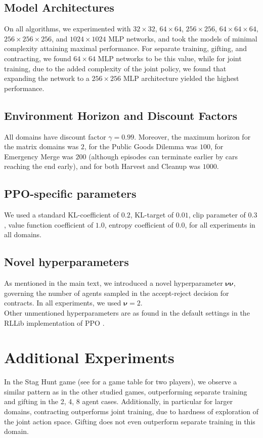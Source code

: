 \subsection{Model Architectures} On all algorithms, we experimented with $32 \times 32$, $64 \times 64$, $256 \times 256$, $64 \times 64 \times 64$, $256 \times 256 \times 256$, and $1024 \times 1024$ MLP networks, and took the models of minimal complexity attaining maximal performance. For separate training, gifting, and contracting, we found $64 \times 64$ MLP networks to be this value, while for joint training, due to the added complexity of the joint policy, we found that expanding the network to a $256 \times 256$ MLP architecture yielded the highest performance.

\subsection{Environment Horizon and Discount Factors} All domains have discount factor $\gamma = 0.99$. Moreover, the maximum horizon for the matrix domains was $2$, for the Public Goods Dilemma was $100$, for Emergency Merge was $200$ (although episodes can terminate earlier by cars reaching the end early), and for both Harvest and Cleanup was ${1000}$. 

\subsection{PPO-specific parameters} We used a standard KL-coefficient of $0.2$,  KL-target of $0.01$, clip parameter of $0.3$, value function coefficient of $1.0$, entropy coefficient of $0.0$, for all experiments in all domains.  

\subsection{Novel hyperparameters} As mentioned in the main text, we introduced a novel hyperparameter $\boldsymbol{\nu}\boldsymbol{\nu}$, governing the number of agents sampled in the accept-reject decision for contracts. In all experiments, we used $\boldsymbol \nu  = 2$. \\

Other unmentioned hyperparameters are as found in the default settings in the RLLib implementation of PPO \cite{liang2018rllib}. 

\section{Additional Experiments}\label{apx:experiments}
In the Stag Hunt game (see  for a game table for two players), we observe a similar pattern as in the other studied games, outperforming separate training and gifting in the 2, 4, 8 agent cases. Additionally, in particular for larger domains, contracting outperforms joint training, due to hardness of exploration of the joint action space. Gifting does not even outperform separate training in this domain. \\

